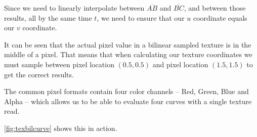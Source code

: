 \documentclass{jcgt}
\begin{document}
Since we need to linearly interpolate between {$\overline{AB}$} and {$\overline{BC}$}, and between those results, all by the same time $t$, we need to ensure that our $u$ coordinate equals our $v$ coordinate.

It can be seen that the actual pixel value in a bilinear sampled texture is in the middle of a pixel.  That means that when calculating our texture coordinates we must sample between pixel location $(0.5,0.5)$ and pixel location $(1.5,1.5)$ to get the correct results.

The common pixel formats contain four color channels – Red, Green, Blue and Alpha – which allows us to be able to evaluate four curves with a single texture read.

\autoref {fig:texbilcurve} shows this in action.

  \begin{figure}
\end{figure}
\end{document}

